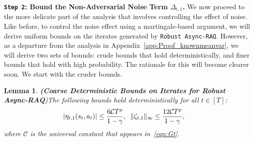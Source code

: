\documentclass{article}
\newcommand{\mc}{\mathcal}
\newtheorem{lemma}{Lemma}
\begin{document}
\textbf{\texttt{Step 2}: Bound the Non-Adversarial Noise Term \(\Delta_{t,1}\).} We now proceed to the more delicate part of the analysis that involves controlling the effect of noise. Like before, to control the noise effect using a martingale-based argument, we will derive uniform bounds on the iterates generated by \texttt{Robust Async-RAQ}. However, as a departure from the analysis in Appendix~\ref{app:Proof_knownmeanvar}, we will derive two sets of bounds: crude bounds that hold deterministically, and finer bounds that hold with high probability. The rationale for this will become clearer soon. We start with the cruder bounds. 

\begin{lemma}\textbf{(Coarse Deterministic Bounds on Iterates for Robust Async-RAQ})\label{lemma:det_bound_iterates_raq} The following bounds hold deterministically for all \(t \in [T]\):
\begin{align}
    \lvert\eta_{t,1}(s_t, a_t)\rvert &\le \frac{6 \mc{C} T^p}{1-\gamma}, \hspace{2 mm} \Vert \zeta_{t,1} \Vert_{\infty} \le \frac{12 \mc{C} T^p}{1-\gamma},
\end{align}
where $\mc{C}$ is the universal constant that appears in~\eqref{eqn:Gt}.
\end{lemma}
\end{document}
